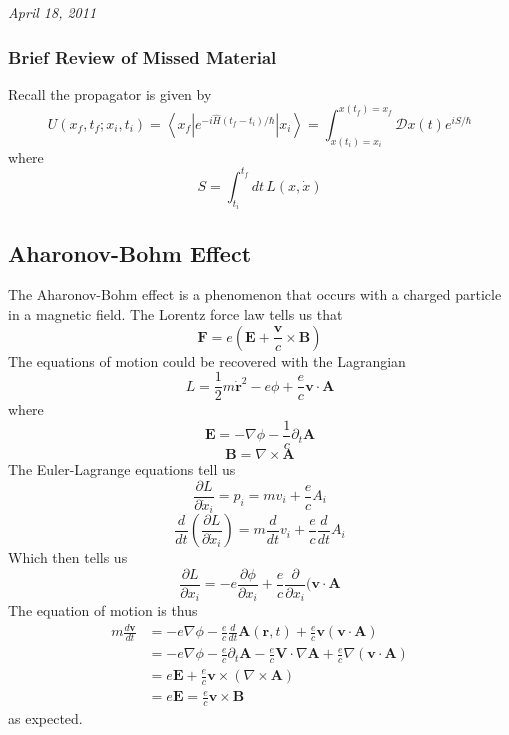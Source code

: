 \documentclass{article}
\begin{document}
	
	\textit{April 18, 2011}
	\subsubsection{Brief Review of Missed Material}
	Recall the propagator is given by
	$$U(x_f,t_f;x_i,t_i)=\left<x_f\left|e^{-i\hat{H}(t_f-t_i)/\hbar}\right|x_i\right>=\int_{x(t_i)=x_i}^{x(t_f)=x_f}\mathcal{D}x(t)e^{iS/\hbar}$$
	where
	$$S=\int_{t_i}^{t_f}dt\,L(x,\dot{x})$$
	\subsection{Aharonov-Bohm Effect}
	The Aharonov-Bohm effect is a phenomenon that occurs with a charged particle in a magnetic field. The Lorentz force law tells us that
	$$\mathbf{F}=e\left(\mathbf{E}+\frac{\mathbf{v}}{c}\times\mathbf{B}\right)$$
	The equations of motion could be recovered with the Lagrangian
	$$L=\frac{1}{2}m\dot{\mathbf{r}}^2-e\phi+\frac{e}{c}\mathbf{v}\cdot\mathbf{A}$$
	where
	$$\mathbf{E}=-\nabla \phi-\frac{1}{c}\partial_t\mathbf{A}$$
	$$\mathbf{B}=\nabla\times\mathbf{A}$$	
	The Euler-Lagrange equations tell us
	$$\frac{\partial L}{\partial \dot{x}_i}=p_i=mv_i+\frac{e}{c}A_i$$
	$$\frac{d}{d t}\left(\frac{\partial L}{\partial \dot{x}_i}\right)=m\frac{d}{dt}v_i+\frac{e}{c}\frac{d}{dt}A_i$$
	Which then tells us
	$$\frac{\partial L}{\partial x_i}=-e\frac{\partial \phi}{\partial x_i}+\frac{e}{c}\frac{\partial}{\partial x_i}(\mathbf{v}\cdot\mathbf{A}$$
	The equation of motion is thus
	\begin{align*}
	m\frac{d\mathbf{v}}{dt}&=-e\nabla \phi-\frac{e}{c}\frac{d}{dt}\mathbf{A}(\mathbf{r},t)+\frac{e}{c}\mathbf{v}(\mathbf{v}\cdot\mathbf{A})\\
	&= -e\nabla\phi-\frac{e}{c}\partial_t\mathbf{A}-\frac{e}{c}\mathbf{V}\cdot\nabla \mathbf{A}+\frac{e}{c}\nabla\left(\mathbf{v}\cdot\mathbf{A}\right)\\
	&=e\mathbf{E}+\frac{e}{c}\mathbf{v}\times(\nabla\times\mathbf{A})\\
	&=e\mathbf{E}=\frac{e}{c}\mathbf{v}\times\mathbf{B}
	\end{align*}
	as expected.\\
	
\end{document}
